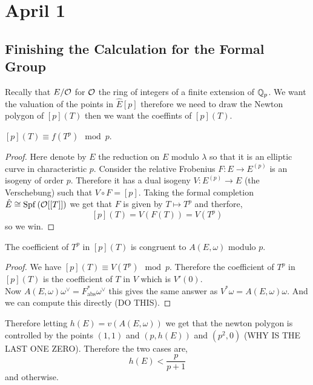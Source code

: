 \documentclass[12pt]{article}
\begin{document}
\section{April 1}

\subsection{Finishing the Calculation for the Formal Group}

\newcommand{\Spf}[1]{\mathrm{Spf}\left( #1 \right)}

Recally that $E / \mathcal{O}$ for $\mathcal{O}$ the ring of integers of a finite extension of $\mathbb{Q}_p$. We want the valuation of the points in $\hat{E}[p]$ therefore we need to draw the Newton polygon of $[p](T)$ then we want the coeffints of $[p](T)$.

\begin{lemma}
$[p](T) \equiv f(T^p) \mod p$. 
\end{lemma}

\begin{proof}
Here denote by $E$ the reduction on $E$ modulo $\lambda$ so that it is an elliptic curve in characteristic $p$.
Consider the relative Frobenius $F : E \to E^{(p)}$ is an isogeny of order $p$. Therefore it has a dual isogeny $V : E^{(p)} \to E$ (the Verschebung) such that $V \circ F = [p]$. Taking the formal completion $\hat{E} \cong \Spf{\cO[[T]]}$ we get that $F$ is given by $T \mapsto T^p$ and therfore,
\[ [p](T) = V(F(T)) = V(T^p) \]
so we win. 
\end{proof}

\begin{lemma}
The coefficient of $T^p$ in $[p](T)$ is congruent to $A(E, \omega)$ modulo $p$.
\end{lemma}

\begin{proof}
We have $[p](T) \equiv V(T^p) \mod p$. Therefore the coefficient of $T^p$ in $[p](T)$ is the coefficient of $T$ in $V$ which is $V'(0)$. 
\bigskip\\
Now $A(E, \omega) \omega^\vee = F_{\text{abs}}^* \omega^\vee$ this gives the same answer as $V^* \omega = A(E, \omega) \omega$. And we can compute this directly (DO THIS).
\end{proof}

Therefore letting $h(E) = v(A(E,\omega))$ we get that the newton polygon is controlled by the points $(1,1)$ and $(p, h(E))$ and $(p^2, 0)$ (WHY IS THE LAST ONE ZERO). Therefore the two cases are,
\[ h(E) < \frac{p}{p+1} \]
and otherwise.
\end{document}
